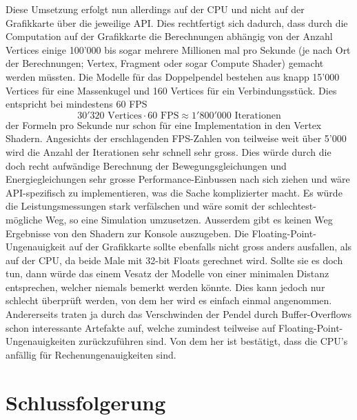 \documentclass[titlepage, 11pt, a4paper, ngerman]{article}
\begin{document}
Diese Umsetzung erfolgt nun allerdings auf der \acrshort{CPU} und nicht auf der Grafikkarte über die jeweilige \acrshort{API}. Dies rechtfertigt sich dadurch, dass durch die Computation auf der Grafikkarte die Berechnungen abhängig von der Anzahl Vertices einige 100'000 bis sogar mehrere Millionen mal pro Sekunde (je nach Ort der Berechnungen; \gls{Vertex}, \gls{Fragment} oder sogar Compute \gls{Shader}) gemacht werden müssten. Die Modelle für das Doppelpendel bestehen aus knapp 15'000 Vertices für eine Massenkugel und 160 Vertices für ein Verbindungsstück. Dies entspricht bei mindestens 60 \acrfull{FPS} $$30'320 \text{ Vertices} \cdot 60 \text{ FPS} \approx 1'800'000 \text{ Iterationen}$$ der Formeln pro Sekunde nur schon für eine Implementation in den Vertex \gls{Shader}n. Angesichts der erschlagenden \acrshort{FPS}-Zahlen von teilweise weit über 5'000 wird die Anzahl der Iterationen sehr schnell sehr gross. Dies würde durch die doch recht aufwändige Berechnung der Bewegungsgleichungen und Energiegleichungen sehr grosse Performance-Einbussen nach sich ziehen und wäre \acrshort{API}-spezifisch zu implementieren, was die Sache komplizierter macht. Es würde die Leistungsmessungen stark verfälschen und wäre somit der schlechtest-mögliche Weg, so eine Simulation umzusetzen. Ausserdem gibt es keinen Weg Ergebnisse von den \gls{Shader}n zur Konsole auszugeben. Die \gls{Floating-Point}-Ungenauigkeit auf der Grafikkarte sollte ebenfalls nicht gross anders ausfallen, als auf der \acrshort{CPU}, da beide Male mit 32-bit \glspl{Float} gerechnet wird. Sollte sie es doch tun, dann würde das einem Vesatz der Modelle von einer minimalen Distanz entsprechen, welcher niemals bemerkt werden könnte. Dies kann jedoch nur schlecht überprüft werden, von dem her wird es einfach einmal angenommen. Andererseits traten ja durch das Verschwinden der Pendel durch Buffer-Overflows schon interessante Artefakte auf, welche zumindest teilweise auf \gls{Floating-Point}-Ungenauigkeiten zurückzuführen sind. Von dem her ist bestätigt, dass die \acrshort{CPU}'s anfällig für Rechenungenauigkeiten sind.


\newpage
\section{Schlussfolgerung}
\end{document}
